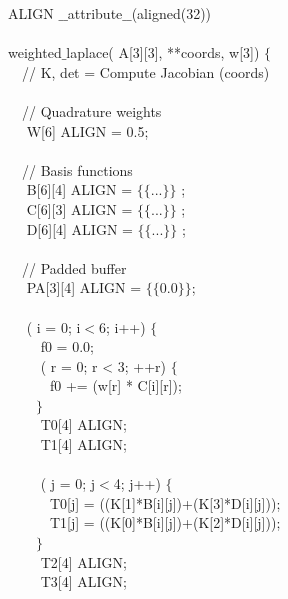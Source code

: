 \begin{algorithm}[htpb]
\scriptsize\ttfamily
{}
 ALIGN $\_\_$attribute$\_\_$(aligned(32)) \\
~\\
 weighted$\_$laplace( A[3][3],  **coords,  w[3]) $\lbrace$\\
~~// K, det = Compute Jacobian (coords) \\
~~\\
~~// Quadrature weights \\
~~ W[6] ALIGN = {0.5}; \\
~~\\
~~// Basis functions \\
~~ B[6][4] ALIGN = $\lbrace\lbrace$...$\rbrace\rbrace$ ;\\
~~ C[6][3] ALIGN = $\lbrace\lbrace$...$\rbrace\rbrace$ ;\\
~~ D[6][4] ALIGN = $\lbrace\lbrace$...$\rbrace\rbrace$ ;\\
~~\\
~~// Padded buffer \\
~~ PA[3][4] ALIGN = $\lbrace\lbrace$0.0$\rbrace\rbrace$;\\
~~\\
~~ ( i = 0; i$<$6; i++) $\lbrace$ \\
~~~~ f0  = 0.0;\\
~~~~ ( r  = 0; r < 3; ++r) $\lbrace$ \\
~~~~~~f0 += (w[r] * C[i][r]);\\
~~~~$\rbrace$ \\
~~~~ T0[4] ALIGN;\\
~~~~ T1[4] ALIGN;\\
~~~~\\
~~~~ ( j = 0; j$<$4; j++) $\lbrace$ \\
~~~~~~T0[j] = ((K[1]*B[i][j])+(K[3]*D[i][j]));\\
~~~~~~T1[j] = ((K[0]*B[i][j])+(K[2]*D[i][j]));\\
~~~~$\rbrace$\\
~~~~ T2[4] ALIGN;\\
~~~~ T3[4] ALIGN;\\
~~~~\\

\end{algorithm}
